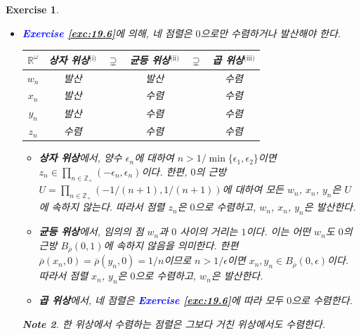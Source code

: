 \documentclass{article}
\newtheorem{exercise}{Exercise}[section]
\newtheorem*{note}{Note}
\newcommand{\R}{\mathbb{R}}
\newcommand{\Z}{\mathbb{Z}}
\begin{document}
\begin{exercise}
\begin{itemize}
\begin{note}
                \textcolor{blue}{\textbf{Exercise \ref{exc:18.7}}}의 note를 추가로 참고하라.
            \end{note}
        \item[(b)] \textcolor{blue}{\textbf{Exercise \ref{exc:19.6}}}에 의해, 네 점렬은 $0$으로만 수렴하거나 발산해야 한다.
            \begin{center}
                \begin{tabular}{|c||ccccc|}
                    \hline
                   $\R^\omega$ & 상자 위상$^{\text{(i)}}$ & $\supsetneq$ & 균등 위상$^{\text{(ii)}}$ & $\supsetneq$ & 곱 위상$^{\text{(iii)}}$ \\ \hline\hline
                   $w_n$ & 발산 && 발산 && 수렴  \\ \hline
                   $x_n$ & 발산 && 수렴 && 수렴 \\ \hline
                   $y_n$ & 발산 && 수렴 && 수렴 \\ \hline
                   $z_n$ & 수렴 && 수렴  && 수렴 \\ \hline
                \end{tabular}
            \end{center}
            \begin{itemize}
                \item[(i)] \textbf{상자 위상}에서, 양수 $\epsilon_n$에 대하여 $n>1/\min\{\epsilon_1,\epsilon_2\}$이면 $z_n\in\prod_{n\in\Z_+}(-\epsilon_n,\epsilon_n)$이다. 한편, $0$의 근방 $U=\prod_{n\in\Z_+}(-1/(n+1),1/(n+1))$에 대하여 모든 $w_n$, $x_n$, $y_n$은 $U$에 속하지 않는다. 따라서 점렬 $z_n$은 $0$으로 수렴하고, $w_n$, $x_n$, $y_n$은 발산한다.
                \item[(ii)] \textbf{균등 위상}에서, 임의의 점 $w_n$과 $0$ 사이의 거리는 $1$이다. 이는 어떤 $w_n$도 $0$의 근방 $B_{\overline{\rho}}(0,1)$에 속하지 않음을 의미한다. 한편 $\overline{\rho}(x_n,0)=\overline{\rho}(y_n,0)=1/n$이므로 $n>1/\epsilon$이면 $x_n,y_n\in B_{\overline{\rho}}(0,\epsilon)$이다. 따라서 점렬 $x_n$, $y_n$은 $0$으로 수렴하고, $w_n$은 발산한다.
                \item[(iii)] \textbf{곱 위상}에서, 네 점렬은 \textcolor{blue}{\textbf{Exercise \ref{exc:19.6}}}에 따라 모두 $0$으로 수렴한다.
            \end{itemize}
            \begin{note}
                한 위상에서 수렴하는 점렬은 그보다 거친 위상에서도 수렴한다.
            \end{note}
    \end{itemize}
\end{exercise}
\end{document}
